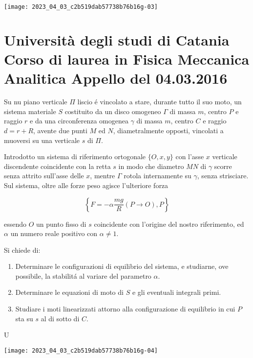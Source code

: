 \documentclass[10pt]{article}
\begin{document}
\begin{center}
\texttt{[image: 2023\_04\_03\_c2b519dab57738b76b16g-03]}
\end{center}

\section{Università degli studi di Catania
Corso di laurea in Fisica
Meccanica Analitica
Appello del 04.03.2016}
Su nu piano verticale \(\Pi\) liscio é vincolato a stare, durante tutto il suo moto, un sistema materiale \(S\) costituito da un disco omogeneo \(\Gamma\) di massa \(m\), centro \(P\) e raggio \(r\) e da una circonferenza omogenea \(\gamma\) di massa \(m\), centro \(C\) e raggio \(d=r+R\), avente due punti \(M\) ed \(N\), diametralmente opposti, vincolati a muoversi su una verticale \(s\) di \(\Pi\).

Introdotto un sistema di riferimento ortogonale \(\{O, x, y\}\) con l'asse \(x\) verticale discendente coincidente con la retta \(s\) in modo che diametro \(M N\) di \(\gamma\) scorre senza attrito sull'asse delle \(x\), mentre \(\Gamma\) rotola internamente su \(\gamma\), senza strisciare. Sul sistema, oltre alle forze peso agisce l'ulteriore forza

\[
\left\{F=-\alpha \frac{m g}{R}(P \rightarrow O), P\right\}
\]

essendo \(O\) un punto fisso di \(s\) coincidente con l'origine del nostro riferimento, ed \(\alpha\) un numero reale positivo con \(\alpha \neq 1\).

Si chiede di:

\begin{enumerate}
  \item Determinare le configurazioni di equilibrio del sistema, e studiarne, ove possibile, la stabilitá al variare del parametro \(\alpha\).

  \item Determinare le equazioni di moto di \(S\) e gli eventuali integrali primi.

  \item Studiare i moti linearizzati attorno alla configurazione di equilibrio in cui \(P\) sta su \(s\) al di sotto di \(C\).

\end{enumerate}

U

\begin{center}
\texttt{[image: 2023\_04\_03\_c2b519dab57738b76b16g-04]}
\end{center}
\end{document}
